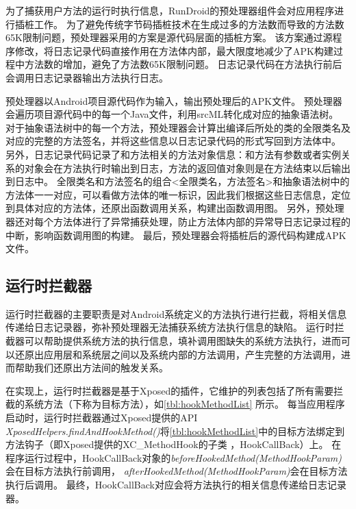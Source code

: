 为了捕获用户方法的运行时执行信息，RunDroid的预处理器组件会对应用程序进行插桩工作。
为了避免传统字节码插桩技术在生成过多的方法数而导致的方法数65K限制问题，预处理器采用的方案是源代码层面的插桩方案。
该方案通过源程序修改，将日志记录代码直接作用在方法体内部，最大限度地减少了APK构建过程中方法数的增加，避免了方法数65K限制问题。
日志记录代码在方法执行前后会调用日志记录器输出方法执行日志。


预处理器以Android项目源代码作为输入，输出预处理后的APK文件。
预处理器会遍历项目源代码中的每一个Java文件，利用srcML转化成对应的抽象语法树。
对于抽象语法树中的每一个方法，预处理器会计算出编译后所处的类的全限类名及对应的完整的方法签名，并将这些信息以日志记录代码的形式写回到方法体中。
另外，日志记录代码记录了和方法相关的方法对象信息：和方法有参数或者实例关系的对象会在方法执行时输出到日志，方法的返回值对象则是在方法结束以后输出到日志中。
全限类名和方法签名的组合<全限类名，方法签名>和抽象语法树中的方法体一一对应，可以看做方法体的唯一标识，因此我们根据这些日志信息，定位到具体对应的方法体，还原出函数调用关系，构建出函数调用图。
另外，预处理器还对每个方法体进行了异常捕获处理，防止方法体内部的异常导日志记录过程的中断，影响函数调用图的构建。
最后，预处理器会将插桩后的源代码构建成APK文件。


\subsection{运行时拦截器}
运行时拦截器的主要职责是对Android系统定义的方法执行进行拦截，将相关信息传递给日志记录器，弥补预处理器无法捕获系统方法执行信息的缺陷。
运行时拦截器可以帮助提供系统方法的执行信息，填补调用图缺失的系统方法执行，进而可以还原出应用层和系统层之间以及系统内部的方法调用，产生完整的方法调用，进而帮助我们还原出方法间的触发关系。

在实现上，运行时拦截器是基于Xposed的插件，它维护的列表包括了所有需要拦截的系统方法（下称为目标方法），如\autoref{tbl:hookMethodList} 所示。
每当应用程序启动时，运行时拦截器通过Xposed提供的API\textit{ XposedHelpers.findAndHookMethod()}将\autoref{tbl:hookMethodList}中的目标方法绑定到方法钩子（即Xposed提供的XC\_MethodHook的子类 ，HookCallBack）上。
在程序运行过程中，HookCallBack对象的\textit{beforeHookedMethod(MethodHookParam)}会在目标方法执行前调用，
\textit{afterHookedMethod(MethodHookParam)}会在目标方法执行后调用。
最终，HookCallBack对应会将方法执行的相关信息传递给日志记录器。



